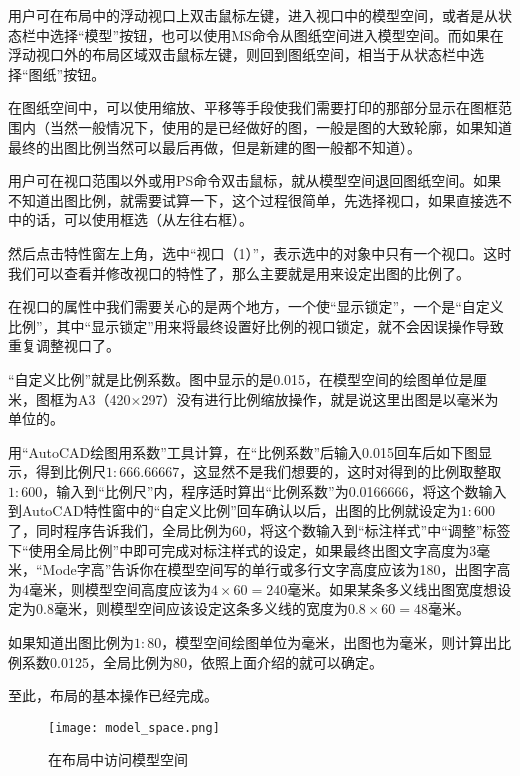 \begin{compactitem}
\item 用户可在布局中的浮动视口上双击鼠标左键，进入视口中的模型空间，或者是从状态栏中选择“模型”按钮，也可以使用MS命令从图纸空间进入模型空间。而如果在浮动视口外的布局区域双击鼠标左键，则回到图纸空间，相当于从状态栏中选择“图纸”按钮。


在图纸空间中，可以使用缩放、平移等手段使我们需要打印的那部分显示在图框范围内（当然一般情况下，使用的是已经做好的图，一般是图的大致轮廓，如果知道最终的出图比例当然可以最后再做，但是新建的图一般都不知道）。

\item 用户可在视口范围以外或用PS命令双击鼠标，就从模型空间退回图纸空间。如果不知道出图比例，就需要试算一下，这个过程很简单，先选择视口，如果直接选不中的话，可以使用框选（从左往右框）。


然后点击特性窗左上角，选中“视口（1）”，表示选中的对象中只有一个视口。这时我们可以查看并修改视口的特性了，那么主要就是用来设定出图的比例了。


在视口的属性中我们需要关心的是两个地方，一个使“显示锁定”，一个是“自定义比例”，其中“显示锁定”用来将最终设置好比例的视口锁定，就不会因误操作导致重复调整视口了。

“自定义比例”就是比例系数。图中显示的是0.015，在模型空间的绘图单位是厘米，图框为A3（420$\times$297）没有进行比例缩放操作，就是说这里出图是以毫米为单位的。

用“AutoCAD绘图用系数”工具计算，在“比例系数”后输入0.015回车后如下图显示，得到比例尺$1:666.66667$，这显然不是我们想要的，这时对得到的比例取整取$1:600$，输入到“比例尺”内，程序适时算出“比例系数”为0.0166666，将这个数输入到AutoCAD特性窗中的“自定义比例”回车确认以后，出图的比例就设定为$1:600$了，同时程序告诉我们，全局比例为60，将这个数输入到“标注样式”中“调整”标签下“使用全局比例”中即可完成对标注样式的设定，如果最终出图文字高度为3毫米，“Mode字高”告诉你在模型空间写的单行或多行文字高度应该为180，出图字高为4毫米，则模型空间高度应该为$4\times 60=240$毫米。如果某条多义线出图宽度想设定为0.8毫米，则模型空间应该设定这条多义线的宽度为$0.8\times 60=48$毫米。

如果知道出图比例为$1:80$，模型空间绘图单位为毫米，出图也为毫米，则计算出比例系数0.0125，全局比例为80，依照上面介绍的就可以确定。

 
至此，布局的基本操作已经完成。


\end{compactitem}



\begin{figure}[htbp]
\centering
\texttt{[image: model\_space.png]}
\caption{在布局中访问模型空间}
\end{figure}

